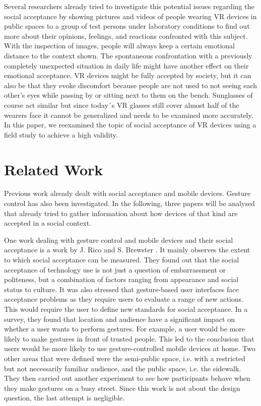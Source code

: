 \documentclass[sigchi]{acmart}
\begin{document}
 \cite{schwind2018virtual} Several researchers already tried to investigate this potential issues regarding the social acceptance by showing pictures and videos of people wearing VR devices in public spaces to a group of test persons under laboratory conditions to find out more about their opinions, feelings, and reactions confronted with this subject.  With the inspection of images, people will always keep a certain emotional distance to the context shown. 
The spontaneous confrontation with a previously completely unexpected situation in daily life might have another effect on their emotional acceptance. VR devices might be fully accepted by society, but it can also be that they evoke discomfort because people are not used to not seeing each other's eyes while passing by or sitting next to them on the bench. Sunglasses of course act similar but since today´s VR glasses still cover almost half of the wearers face it cannot be generalized and needs to be examined more accurately.
In this paper, we reexamined the topic of social acceptance of VR devices using a field study to achieve a high validity.

\section{Related Work}
Previous work already dealt with social acceptance and mobile devices. Gesture control has also been investigated. In the following, three papers will be analysed that already tried to gather information about how devices of that kind are accepted in a social context.

One work dealing with gesture control and mobile devices and their social acceptance is a work by J. Rico and S. Brewster \cite{rico2010usable}. It mainly observes the extent to which social acceptance can be measured. They found out that the social acceptance of technology use is not just a question of embarrassment or politeness, but a combination of factors ranging from appearance and social status to culture. It was also stressed that gesture-based user interfaces face acceptance problems as they require users to evaluate a range of new actions. This would require the user to define new standards for social acceptance. In a survey, they found that location and audience have a significant impact on whether a user wants to perform gestures. For example, a user would be more likely to make gestures in front of trusted people. This led to the conclusion that users would be more likely to use gesture-controlled mobile devices at home. Two other areas that were defined were the semi-public space, i.e. with a restricted but not necessarily familiar audience, and the public space, i.e. the sidewalk. They then carried out another experiment to see how participants behave when they make gestures on a busy street. Since this work is not about the design question, the last attempt is negligible.
\end{document}
